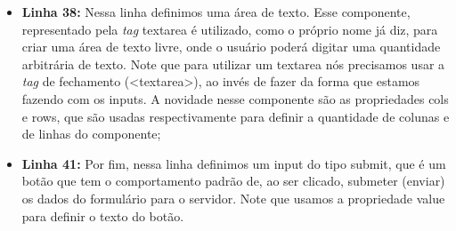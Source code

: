 \begin{itemize}
    \item \textbf{Linha 38:} Nessa linha definimos uma área de texto. Esse componente, representado pela \textit{tag} textarea é utilizado, como o próprio nome já diz, para criar uma área de texto livre, onde o usuário poderá digitar uma quantidade arbitrária de texto. Note que para utilizar um textarea nós precisamos usar a \textit{tag} de fechamento (<textarea>), ao invés de fazer da forma que estamos fazendo com os inputs. A novidade nesse componente são as propriedades cols e rows, que são usadas respectivamente para definir a quantidade de colunas e de linhas do componente;
    
    \item \textbf{Linha 41:} Por fim, nessa linha definimos um input do tipo submit, que é um botão que tem o comportamento padrão de, ao ser clicado, submeter (enviar) os dados do formulário para o servidor. Note que usamos a propriedade value para definir o texto do botão.
\end{itemize}


